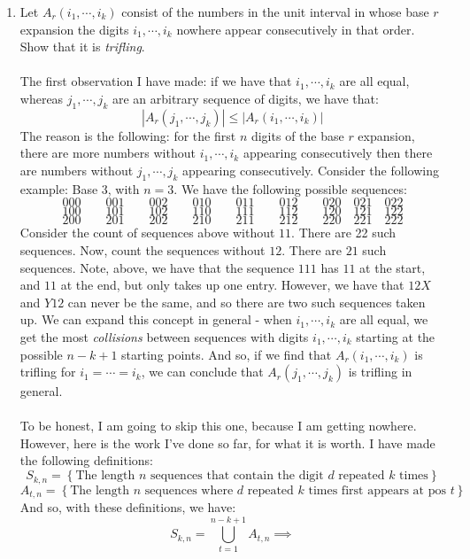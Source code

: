 \documentclass[12pt,a4paper]{article}
\newcommand{\1}[1]{\mathbbm{1}\left\{ #1 \right\}}
\begin{document}
\begin{enumerate}
	\item Let $A_r(i_1, \cdots, i_k)$ consist of the numbers in the unit interval in whose base $r$ expansion the digits $i_1, \cdots, i_k$ nowhere appear consecutively in that order. Show that it is \textit{trifling}.
	\\\\
	The first observation I have made: if we have that $i_1, \cdots, i_k$ are all equal, whereas $j_1, \cdots, j_k$ are an arbitrary sequence of digits, we have that:
	$$
		|A_r(j_1, \cdots, j_k)| \leq |A_r(i_1, \cdots, i_k)|
	$$
	The reason is the following: for the first $n$ digits of the base $r$ expansion, there are more numbers without $i_1, \cdots, i_k$ appearing consecutively then there are numbers without $j_1, \cdots, j_k$ appearing consecutively. Consider the following example: Base 3, with $n = 3$. We have the following possible sequences:
	$$
	000 \quad\quad 001 \quad\quad 002 \quad\quad 010 \quad\quad 011 \quad\quad 012 \quad\quad 020 \quad 021 \quad 022
	$$
	$$
	100 \quad\quad 101 \quad\quad 102 \quad\quad 110 \quad\quad 111 \quad\quad 112 \quad\quad 120 \quad 121 \quad 122
	$$
	$$
	200 \quad\quad 201 \quad\quad 202 \quad\quad 210 \quad\quad 211 \quad\quad 212 \quad\quad 220 \quad 221 \quad 222
	$$
	Consider the count of sequences above without $11$. There are 22 such sequences. Now, count the sequences without $12$. There are $21$ such sequences. Note, above, we have that the sequence $111$ has $11$ at the start, and $11$ at the end, but only takes up one entry. However, we have that $12X$ and $Y12$ can never be the same, and so there are two such sequences taken up. We can expand this concept in general - when $i_1, \cdots, i_k$ are all equal, we get the most \textit{collisions} between sequences with digits $i_1, \cdots, i_k$ starting at the possible $n - k + 1$ starting points. And so, if we find that $A_r(i_1, \cdots, i_k)$ is trifling for $i_1 = \cdots = i_k$, we can conclude that $A_r(j_1, \cdots, j_k)$ is trifling in general.
	\\\\
	To be honest, I am going to skip this one, because I am getting nowhere. However, here is the work I've done so far, for what it is worth. I have made the following definitions:
	$$
		S_{k,n} = \left\{\text{The length $n$ sequences that contain the digit $d$ repeated $k$ times}\right\}
	$$
	$$
		A_{t,n} = \left\{\text{The length $n$ sequences where $d$ repeated $k$ times first appears at pos $t$}\right\}
	$$
	And so, with these definitions, we have:
	$$
		S_{k,n} = \bigcup_{t=1}^{n-k+1} A_{t,n} \implies
$$
\end{enumerate}
\end{document}

